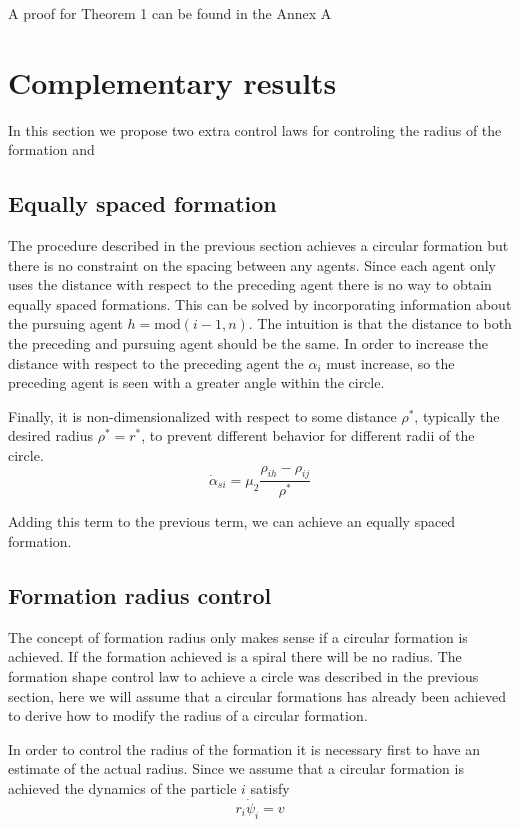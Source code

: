 A proof for Theorem 1 can be found in the Annex A

\section{Complementary results}
In this section we propose two extra control laws for controling the radius of the formation and 

\subsection{Equally spaced formation}
The procedure described in the previous section achieves a circular formation but there is no constraint on the spacing between any agents. Since each agent only uses the distance with respect to the preceding agent there is no way to obtain equally spaced formations. This can be solved by incorporating information about the pursuing agent $h = \textrm{mod}(i-1,n)$. The intuition is that the distance to both the preceding and pursuing agent should be the same. In order to increase the distance with respect to the preceding agent the $\alpha_i$ must increase, so the preceding agent is seen with a greater angle within the circle. 

Finally, it is non-dimensionalized with respect to some distance $\rho^*$, typically the desired radius $\rho^*=r^*$, to prevent different behavior for different radii of the circle.
\begin{equation}
\label{spacing}
\dot{\alpha}_{si}= \mu_2 \frac{\rho_{ih} - \rho_{ij}}{\rho^*}
\end{equation}

Adding this term to the previous term, we can achieve an equally spaced formation.

\subsection{Formation radius control}
The concept of formation radius only makes sense if a circular formation is achieved. If the formation achieved is a spiral there will be no radius. The formation shape control law to achieve a circle was described in the previous section, here we will assume that a circular formations has already been achieved to derive how to modify the radius of a circular formation.

In order to control the radius of the formation it is necessary first to have an estimate of the actual radius. Since we assume that a circular formation is achieved the dynamics of the particle $i$ satisfy
\begin{equation}
r_i \dot{\psi}_i = v
\end{equation}

